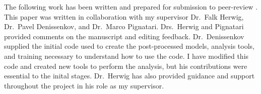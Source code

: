 \label{sec:thepaper}
\label{chapter:impact_of_3D_nuclear_pnuclei_OCmerger}

\newlength{\savedunitlength}
\setlength{\unitlength}{2em}

The following work has been written and prepared for submission to peer-review \citep{issaImpact3DMacro2025}.
This paper was written in collaboration with my supervisor Dr.\ Falk Herwig, Dr.\ Pavel Denissenkov, and Dr.\ Marco Pignatari.
Drs.\ Herwig and Pignatari provided comments on the manuscript and editing feedback.
Dr.\ Denissenkov supplied the initial code used to create the post-processed models, analysis tools, and training necessary to understand how to use the code.
I have modified this code and created new tools to perform the analysis, but his contributions were essential to the inital stages.
Dr.\ Herwig has also provided guidance and support throughout the project in his role as my supervisor.



\setlength{\unitlength}{\savedunitlength}
